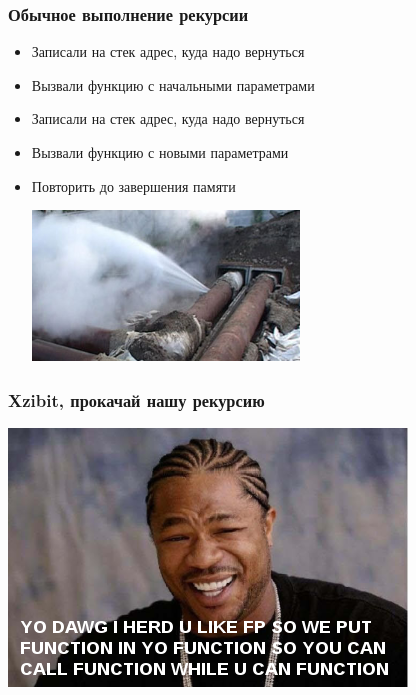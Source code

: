 \documentclass{beamer}
\begin{document}
\begin{frame}
  \frametitle{Обычное выполнение рекурсии}
  \begin{itemize}
  \item Записали на стек адрес, куда надо вернуться
    \pause
  \item Вызвали функцию с начальными параметрами
    \pause
  \item Записали на стек адрес, куда надо вернуться
    \pause
  \item Вызвали функцию с новыми параметрами
    \pause
  \item Повторить до завершения памяти
    \begin{center}
      \includegraphics[height=4cm]{overflow.png}
    \end{center}

  \end{itemize}
\end{frame}

\begin{frame}
  \frametitle{Xzibit, прокачай нашу рекурсию}
  \includegraphics{xzibit-happy.png}
\end{frame}
\end{document}
